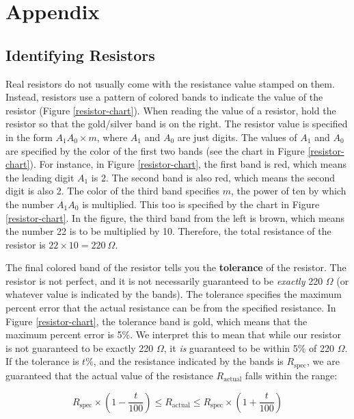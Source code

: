 \documentclass[12pt]{article}
\begin{document}
	\section*{Appendix}
	\subsection*{Identifying Resistors}
	Real resistors do not usually come with the resistance value stamped on them. Instead, resistors use a pattern of colored bands to indicate the value of the resistor (Figure \ref{resistor-chart}). When reading the value of a resistor, hold the resistor so that the gold/silver band is on the right. The resistor value is specified in the form $A_1A_0\times m$, where $A_1$ and $A_0$ are just digits. The values of $A_1$ and $A_0$ are specified by the color of the first two bands (see the chart in Figure \ref{resistor-chart}). For instance, in Figure \ref{resistor-chart}, the first band is red, which means the leading digit $A_1$ is 2. The second band is also red, which means the second digit is also 2. The color of the third band specifies $m$, the power of ten by which the number $A_1A_0$ is multiplied. This too is specified by the chart in Figure \ref{resistor-chart}. In the figure, the third band from the left is brown, which means the number 22 is to be multiplied by 10. Therefore, the total resistance of the resistor is $22\times10=220\ \Omega$.
	
	The final colored band of the resistor tells you the \textbf{tolerance} of the resistor. The resistor is not perfect, and it is not necessarily guaranteed to be \textit{exactly} 220 $\Omega$ (or whatever value is indicated by the bands). The tolerance specifies the maximum percent error that the actual resistance can be from the specified resistance. In Figure \ref{resistor-chart}, the tolerance band is gold, which means that the maximum percent error is 5\%. We interpret this to mean that while our resistor is not guaranteed to be exactly 220 $\Omega$, it \textit{is} guaranteed to be within 5\% of 220 $\Omega$. If the tolerance is $t\%$, and the resistance indicated by the bands is $R_\mathrm{spec}$, we are guaranteed that the actual value of the resistance $R_\mathrm{actual}$ falls within the range:
	
	\begin{equation*}
			 R_\mathrm{spec}\times \left(1-\frac{t}{100}\right)\leq R_\mathrm{actual}\leq R_\mathrm{spec}\times\left(1+\frac{t}{100}\right)
	\end{equation*}
\end{document}
